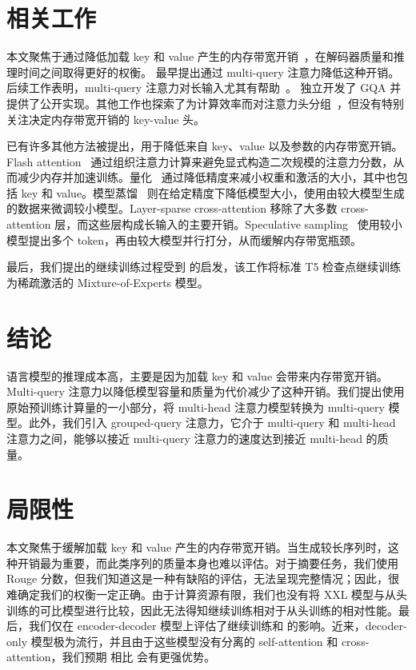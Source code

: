 \documentclass[11pt]{article}
\begin{document}



\section{相关工作}

本文聚焦于通过降低加载 key 和 value 产生的内存带宽开销~\citep{roofline}，在解码器质量和推理时间之间取得更好的权衡。 \citet{shazeer2019mq} 最早提出通过 multi-query 注意力降低这种开销。后续工作表明，multi-query 注意力对长输入尤其有帮助~\citep{palminference, dejong2022fido}。 \citet{gqamrabe} 独立开发了 GQA 并提供了公开实现。其他工作也探索了为计算效率而对注意力头分组~\citep{grouptrans, gmha, pillars}，但没有特别关注决定内存带宽开销的 key-value 头。

已有许多其他方法被提出，用于降低来自 key、value 以及参数的内存带宽开销。Flash attention~\citep{flashattention} 通过组织注意力计算来避免显式构造二次规模的注意力分数，从而减少内存并加速训练。量化~\citep{int8, gptq} 通过降低精度来减小权重和激活的大小，其中也包括 key 和 value。模型蒸馏~\citep{distill, distillsurvey} 则在给定精度下降低模型大小，使用由较大模型生成的数据来微调较小模型。Layer-sparse cross-attention \citep{dejong2022fido} 移除了大多数 cross-attention 层，而这些层构成长输入的主要开销。Speculative sampling~\citep{specchen, specleviathan} 使用较小模型提出多个 token，再由较大模型并行打分，从而缓解内存带宽瓶颈。

最后，我们提出的继续训练过程受到 \citet{sparsemoe} 的启发，该工作将标准 T5 检查点继续训练为稀疏激活的 Mixture-of-Experts 模型。

\label{section:related}

\section{结论}
\label{section:conclusion}

语言模型的推理成本高，主要是因为加载 key 和 value 会带来内存带宽开销。Multi-query 注意力以降低模型容量和质量为代价减少了这种开销。我们提出使用原始预训练计算量的一小部分，将 multi-head 注意力模型转换为 multi-query 模型。此外，我们引入 grouped-query 注意力，它介于 multi-query 和 multi-head 注意力之间，能够以接近 multi-query 注意力的速度达到接近 multi-head 的质量。

\section*{局限性}

本文聚焦于缓解加载 key 和 value 产生的内存带宽开销。当生成较长序列时，这种开销最为重要，而此类序列的质量本身也难以评估。对于摘要任务，我们使用 Rouge 分数，但我们知道这是一种有缺陷的评估，无法呈现完整情况；因此，很难确定我们的权衡一定正确。由于计算资源有限，我们也没有将 XXL \gmq 模型与从头训练的可比模型进行比较，因此无法得知继续训练相对于从头训练的相对性能。最后，我们仅在 encoder-decoder 模型上评估了继续训练和 \gmq 的影响。近来，decoder-only 模型极为流行，并且由于这些模型没有分离的 self-attention 和 cross-attention，我们预期 \gmq 相比 \mq 会有更强优势。
\end{document}
